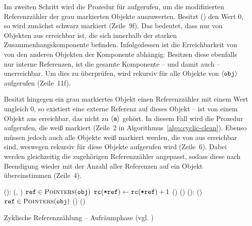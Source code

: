 Im zweiten Schritt wird die Prozedur  für  aufgerufen, um die modifizierten Referenzzähler der grau markierten Objekte auszuwerten.
Besitzt () den Wert $0$, so wird  zunächst schwarz markiert (Zeile~9f).
Das bedeutet, dass  nur von Objekten aus erreichbar ist, die sich innerhalb der starken Zusammenhangskomponente befinden.
Infolgedessen ist die Erreichbarkeit von  von den anderen Objekten der Komponente abhängig: Besitzen diese ebenfalls nur interne Referenzen, ist die gesamte Komponente -- und damit auch  -- unerreichbar.
Um dies zu überprüfen, wird  rekursiv für alle Objekte von $\left\langle\texttt{obj}\right\rangle$ aufgerufen (Zeile~11f).

Besitzt hingegen ein grau markiertes Objekt  einen Referenzzähler mit einem Wert ungleich $0$, so existiert eine externe Referenz auf dieses Objekt --  ist von einem Objekt aus erreichbar, das nicht zu $\left\langle\texttt{a}\right\rangle$ gehört.
In diesem Fall wird die Prozedur  aufgerufen, die  weiß markiert (Zeile~2 in Algorithmus~\ref{algo:cyclic-clean}).
Ebenso müssen jedoch auch alle Objekte weiß markiert werden, die von  aus erreichbar sind, 
weswegen  rekursiv für diese Objekte aufgerufen wird (Zeile~6).
Dabei werden gleichzeitig die zugehörigen Referenzzähler angepasst, sodass diese nach Beendigung wieder mit der Anzahl aller Referenzen auf ein Objekt übereinstimmen (Zeile~4).

\begin{algorithm}[h]
\begin{algorithmic}[1]
	\State {}():
	\State \quad {}(, )		
	\State \quad \FOREACH $\texttt{ref} \in \textsc{Pointers}(\texttt{obj})$
	\State \quad \quad $\texttt{rc}(\texttt{*ref}) \gets \texttt{rc}(\texttt{*ref})+1$ 
	\State \quad \quad \IF \NOT {}()
	\State \quad \quad \quad {}()
	\Statex
	\State {}():
	\State \quad \IF {}()	
	\State \quad \quad \FOREACH $\texttt{ref} \in \textsc{Pointers}(\texttt{obj})$
	\State \quad \quad \quad {}()
	\State \quad \quad {}()
\end{algorithmic}
\caption[Zyklische Referenzzählung -- Aufräumphase]{Zyklische Referenzzählung -- Aufräumphase (vgl. \cite[S. 33]{martinez1990})}
\label{algo:cyclic-clean}
\end{algorithm}

